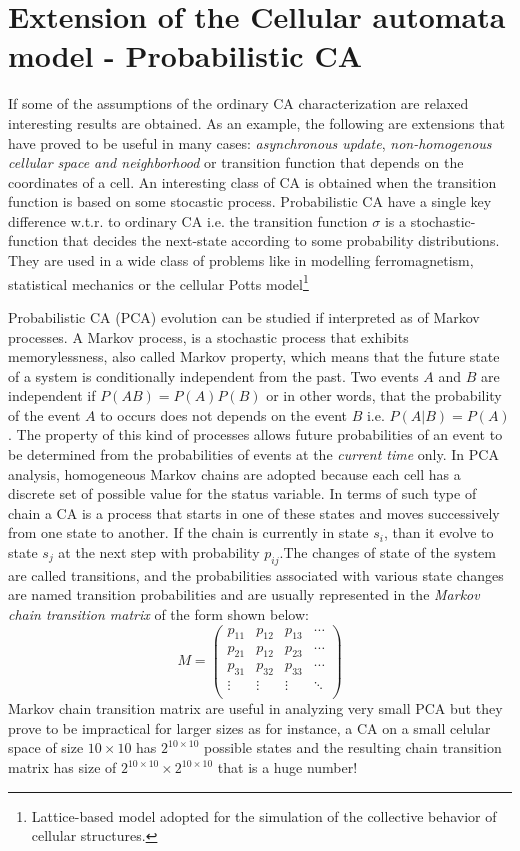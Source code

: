 \section{Extension of the Cellular automata model - Probabilistic CA}
If some of the assumptions of the ordinary CA characterization are relaxed interesting results are obtained.
As an example, the following are extensions that have proved to be useful in many cases: \textit{asynchronous update}, \textit{non-homogenous cellular space and neighborhood} or  transition function that depends on the coordinates of a cell. An interesting class of CA is obtained when the transition function is based on some stocastic process. 
Probabilistic CA\cite{MAIRESSE201442} have a single key difference w.t.r. to ordinary CA i.e. the transition function $\sigma$ is a stochastic-function that decides the next-state according to some probability distributions.
They are used in a wide class of
problems like in modelling ferromagnetism, statistical mechanics
\cite{Vichniac1984} or the cellular Potts model\footnote{Lattice-based model adopted for the simulation of the collective behavior of cellular structures.}\cite{RevModPhys.54.235}

Probabilistic CA (PCA) evolution can be studied if interpreted as of Markov processes.
A Markov process, is a stochastic process that exhibits
memorylessness, also  called Markov property, which means that the
future state of  a system is conditionally independent from the past.
 Two events $A$ and $B$ are independent if
 $P(A B)=P(A)P(B)$ or in other words, that the probability of the event $A$ to occurs does not depends on the event $B$ i.e. $P(A|B)=P(A)$. 
The property of this kind of  processes allows  future probabilities of an event to be
determined from the probabilities of events at the \textit{current time} only.
In PCA analysis, homogeneous Markov chains are adopted because each cell has a
discrete set of possible value for the status variable.
In terms of such  type of chain a CA is a process that starts in one of these states and moves
successively from one state to another. If the chain is currently in state
$s_i$, than it evolve to state $s_j$ at
the next step with probability $p_{ij}$.The changes of state
of the system are called transitions, and the probabilities associated with
various state changes are named transition probabilities and are usually represented
in the \textit{Markov chain transition matrix} of the form shown below:
\[
M =
\left( {\begin{array}{cccc}
p_{11} & p_{12} & p_{13} &\cdots \\
p_{21} & p_{12} & p_{23} &\cdots \\
p_{31} & p_{32} & p_{33} &\cdots \\
\vdots & \vdots  &\vdots& \ddots\\
\end{array} } \right)
\]
Markov chain transition matrix are useful in analyzing very small PCA but they prove to be impractical for larger sizes as for instance, a
CA on a small celular space of size $10\times10$  has
$2^{10\times10}$ possible states and the resulting chain transition matrix
has size of $2^{10\times10}\times2^{10\times10}$ that is a
huge number! 
